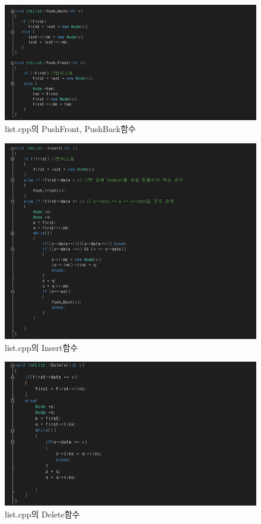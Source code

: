 \documentclass[a4paper,12pt]{article}
\begin{document}
    
    \newpage
    \begin{figure}[t]\vspace*{4pt} 
    \centerline{\includegraphics[width=1.0\columnwidth]{pbpf}} 
    \caption{list.cpp의 PushFront, PushBack함수}\vspace*{-6pt} 
    \label{figure:pbpf} 
    \end{figure} 
    
    \begin{figure}[t]\vspace*{4pt} 
    \centerline{\includegraphics[width=1.0\columnwidth]{ins}} 
    \caption{list.cpp의 Insert함수}\vspace*{-6pt} 
    \label{figure:f2} 
    \end{figure} 
    
    \newpage
    \begin{figure}[t]\vspace*{4pt} 
    \centerline{\includegraphics[width=1.0\columnwidth]{delete}} 
    \caption{list.cpp의 Delete함수}\vspace*{-6pt} 
    \label{figure:f3} 
    \end{figure} 
        
    
\end{document}

